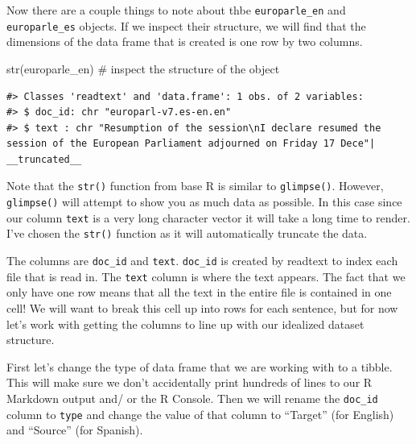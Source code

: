\documentclass[
  letterpaper,
]{latex/krantz}
\newenvironment{Shaded}{\begin{snugshade}}{\end{snugshade}}
\newcommand{\CommentTok}[1]{\textcolor[rgb]{0.37,0.37,0.37}{#1}}
\newcommand{\FunctionTok}[1]{\textcolor[rgb]{0.28,0.35,0.67}{#1}}
\newcommand{\NormalTok}[1]{\textcolor[rgb]{0.00,0.23,0.31}{#1}}
\begin{document}
Now there are a couple things to note about thbe \texttt{europarle\_en}
and \texttt{europarle\_es} objects. If we inspect their structure, we
will find that the dimensions of the data frame that is created is one
row by two columns.

\begin{Shaded}
\begin{Highlighting}[]
\FunctionTok{str}\NormalTok{(europarle\_en) }\CommentTok{\# inspect the structure of the object}
\end{Highlighting}
\end{Shaded}

\begin{verbatim}
#> Classes 'readtext' and 'data.frame': 1 obs. of 2 variables:
#> $ doc_id: chr "europarl-v7.es-en.en"
#> $ text : chr "Resumption of the session\nI declare resumed the
session of the European Parliament adjourned on Friday 17 Dece"|
__truncated__
\end{verbatim}

\begin{tcolorbox}[enhanced jigsaw, toprule=.15mm, bottomtitle=1mm, coltitle=black, title=\textcolor{quarto-callout-warning-color}{\faExclamationTriangle}\hspace{0.5em}{Tip}, left=2mm, colframe=quarto-callout-warning-color-frame, bottomrule=.15mm, colbacktitle=quarto-callout-warning-color!10!white, leftrule=.75mm, colback=white, titlerule=0mm, breakable, toptitle=1mm, opacityback=0, arc=.35mm, rightrule=.15mm, opacitybacktitle=0.6]

Note that the \texttt{str()} function from base R is similar to
\texttt{glimpse()}. However, \texttt{glimpse()} will attempt to show you
as much data as possible. In this case since our column \texttt{text} is
a very long character vector it will take a long time to render. I've
chosen the \texttt{str()} function as it will automatically truncate the
data.

\end{tcolorbox}

The columns are \texttt{doc\_id} and \texttt{text}. \texttt{doc\_id} is
created by readtext to index each file that is read in. The
\texttt{text} column is where the text appears. The fact that we only
have one row means that all the text in the entire file is contained in
one cell! We will want to break this cell up into rows for each
sentence, but for now let's work with getting the columns to line up
with our idealized dataset structure.

First let's change the type of data frame that we are working with to a
tibble. This will make sure we don't accidentally print hundreds of
lines to our R Markdown output and/ or the R Console. Then we will
rename the \texttt{doc\_id} column to \texttt{type} and change the value
of that column to ``Target'' (for English) and ``Source'' (for Spanish).
\end{document}
